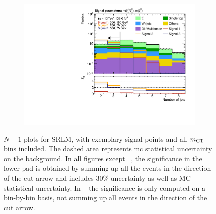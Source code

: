 \begin{figure}
\begin{subfigure}[b]{0.4\linewidth}
		\centering\includegraphics[width=\textwidth]{n1_SRLM_mct_bins/nJet30.pdf}
		\caption{\label{fig:Wh_reopt_second_round_n1_srlm_njet}}
	\end{subfigure}
	\caption{$N-1$ plots for SRLM, with exemplary signal points and all $m_{\textrm{CT}}$ bins included. The dashed area represents \gls{mc} statistical uncertainty on the background. In all figures except \figname~, the significance in the lower pad is obtained by summing up all the events in the direction of the cut arrow and includes 30\% uncertainty as well as MC statistical uncertainty. In \figname~ the significance is only computed on a bin-by-bin basis, \ie not summing up all events in the direction of the cut arrow.}
	\label{fig:Wh_reopt_second_round_n1_srlm}
\end{figure}

